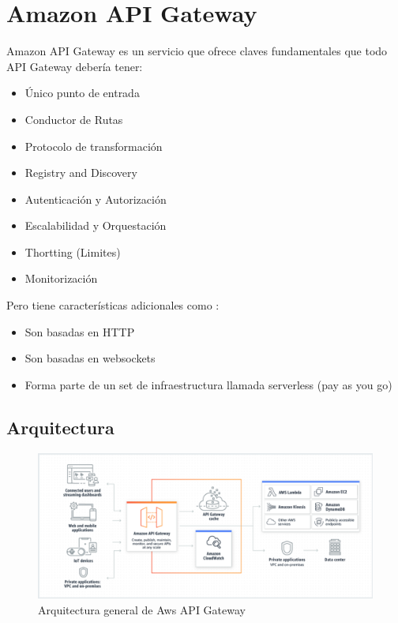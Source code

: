 \section{Amazon API Gateway}

Amazon API Gateway es un servicio que ofrece claves fundamentales que todo API Gateway debería tener: \
\begin{itemize}
	\item Único punto de entrada
	\item Conductor de Rutas
	\item Protocolo de transformación
	\item Registry and Discovery
	\item Autenticación y Autorización
	\item Escalabilidad y Orquestación
	\item Thortting (Limites)
	\item Monitorización
\end{itemize}

Pero tiene características adicionales como : \

\begin{itemize}
	\item Son basadas en HTTP
	\item Son basadas en websockets
	\item Forma parte de un set de infraestructura llamada serverless (pay as you go)
\end{itemize}
\subsection{Arquitectura}
\begin{figure}[htbp]
	\centering
	\includegraphics[width=\columnwidth]{images/architecture_aws_api_gateway}
	\caption{Arquitectura general de Aws API Gateway}
	\label{fig:architecture_aws_api_gateway}
\end{figure}

